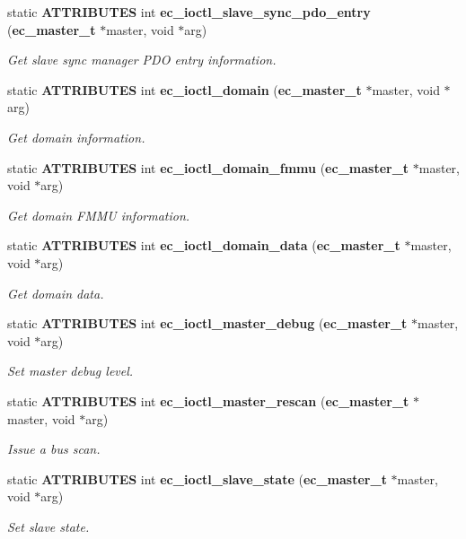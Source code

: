 \begin{DoxyCompactItemize}
static {\bf A\-T\-T\-R\-I\-B\-U\-T\-E\-S} int {\bf ec\-\_\-ioctl\-\_\-slave\-\_\-sync\-\_\-pdo\-\_\-entry} ({\bf ec\-\_\-master\-\_\-t} $\ast$master, void $\ast$arg)
\begin{DoxyCompactList}\small\item\em Get slave sync manager P\-D\-O entry information. \end{DoxyCompactList}\item 
static {\bf A\-T\-T\-R\-I\-B\-U\-T\-E\-S} int {\bf ec\-\_\-ioctl\-\_\-domain} ({\bf ec\-\_\-master\-\_\-t} $\ast$master, void $\ast$arg)
\begin{DoxyCompactList}\small\item\em Get domain information. \end{DoxyCompactList}\item 
static {\bf A\-T\-T\-R\-I\-B\-U\-T\-E\-S} int {\bf ec\-\_\-ioctl\-\_\-domain\-\_\-fmmu} ({\bf ec\-\_\-master\-\_\-t} $\ast$master, void $\ast$arg)
\begin{DoxyCompactList}\small\item\em Get domain F\-M\-M\-U information. \end{DoxyCompactList}\item 
static {\bf A\-T\-T\-R\-I\-B\-U\-T\-E\-S} int {\bf ec\-\_\-ioctl\-\_\-domain\-\_\-data} ({\bf ec\-\_\-master\-\_\-t} $\ast$master, void $\ast$arg)
\begin{DoxyCompactList}\small\item\em Get domain data. \end{DoxyCompactList}\item 
static {\bf A\-T\-T\-R\-I\-B\-U\-T\-E\-S} int {\bf ec\-\_\-ioctl\-\_\-master\-\_\-debug} ({\bf ec\-\_\-master\-\_\-t} $\ast$master, void $\ast$arg)
\begin{DoxyCompactList}\small\item\em Set master debug level. \end{DoxyCompactList}\item 
static {\bf A\-T\-T\-R\-I\-B\-U\-T\-E\-S} int {\bf ec\-\_\-ioctl\-\_\-master\-\_\-rescan} ({\bf ec\-\_\-master\-\_\-t} $\ast$master, void $\ast$arg)
\begin{DoxyCompactList}\small\item\em Issue a bus scan. \end{DoxyCompactList}\item 
static {\bf A\-T\-T\-R\-I\-B\-U\-T\-E\-S} int {\bf ec\-\_\-ioctl\-\_\-slave\-\_\-state} ({\bf ec\-\_\-master\-\_\-t} $\ast$master, void $\ast$arg)
\begin{DoxyCompactList}\small\item\em Set slave state. \end{DoxyCompactList}\item 

\end{DoxyCompactItemize}
